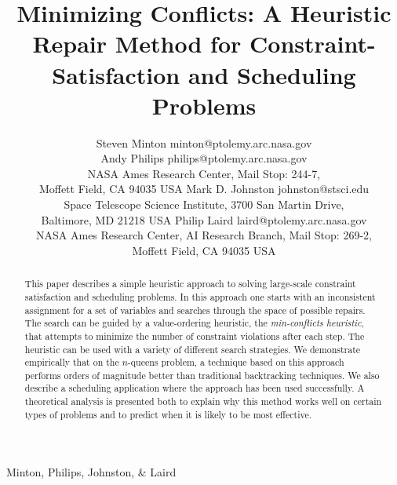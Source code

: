 
{Minton, Philips, Johnston, \& Laird}



\title{Minimizing Conflicts: A Heuristic Repair Method for
       Constraint-Satisfaction and Scheduling Problems}

\author{\name Steven Minton \email minton@ptolemy.arc.nasa.gov \\
       \name Andy Philips \email philips@ptolemy.arc.nasa.gov \\
       \addr NASA Ames Research Center, Mail Stop: 244-7,\\
       Moffett Field, CA  94035 USA
       \AND
       \name Mark D. Johnston \email johnston@stsci.edu \\
       \addr Space Telescope Science Institute,
       3700 San Martin Drive,\\
       Baltimore, MD 21218 USA
       \AND
       \name Philip Laird \email laird@ptolemy.arc.nasa.gov \\
       \addr NASA Ames Research Center,
       AI Research Branch, Mail Stop: 269-2,\\
       Moffett Field, CA  94035 USA}


\maketitle


\begin{abstract}
This paper describes a simple heuristic approach to solving large-scale
constraint satisfaction and scheduling problems.  In this approach one
starts with an inconsistent assignment for a set of variables and
searches through the space of possible repairs. The search can be guided
by a value-ordering heuristic, the {\em min-conflicts heuristic}, that
attempts to minimize the number of constraint violations after each
step.  The heuristic can be used with a variety of different search
strategies.  We demonstrate empirically that on the $n$-queens problem, 
a technique
based on this approach performs orders of magnitude better than
traditional backtracking techniques.  We also describe a
scheduling application where the approach has been used successfully.  A
theoretical analysis is presented both to explain why this method works
well on certain types of problems and to predict when it is likely to
be most effective.
\end{abstract}

